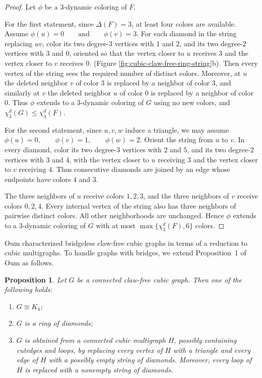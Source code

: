 \documentclass[a4paper,11pt]{article}
\newtheorem{proposition}[theorem] {Proposition}
\theoremstyle{case}
\numberwithin{subcase}{case}
\begin{document}
\begin{proof}
Let $\phi$ be a $3$-dynamic coloring of $F$.

For the first statement, since $\Delta(F)=3$, at least four colors are
available. Assume
$
\phi(u)=0
\qquad\text{and}\qquad
\phi(v)=3.
$
For each diamond in the string replacing $uv$, color its two degree-$3$
vertices with $1$ and $2$, and its two degree-$2$ vertices with $3$ and
$0$, oriented so that the vertex closer to $u$ receives $3$ and the
vertex closer to $v$ receives $0$.
(Figure \ref{fig:cubic-claw-free-ring-string}b).
Then every vertex of the string sees the required number of distinct
colors. Moreover, at $u$ the deleted neighbor $v$ of color $3$ is
replaced by a neighbor of color $3$, and similarly at $v$ the deleted
neighbor $u$ of color $0$ is replaced by a neighbor of color $0$.
Thus $\phi$ extends to a $3$-dynamic coloring of $G$ using no new
colors, and
$
\chi_3^d(G)\leq\chi_3^d(F).
$

For the second statement, 
since $u,v,w$ induce a triangle,
we may assume
$
\phi(u)=0,\qquad
\phi(v)=1,\qquad
\phi(w)=2.
$
Orient the string from $u$ to $v$. In every diamond, color its two
degree-$3$ vertices with $2$ and $5$, and its two degree-$2$ vertices
with $3$ and $4$, with the vertex closer to $u$ receiving $3$ and the
vertex closer to $v$ receiving $4$. Thus consecutive diamonds are
joined by an edge whose endpoints have colors $4$ and $3$.

The three neighbors of $u$ receive colors $1,2,3$, and the three
neighbors of $v$ receive colors $0,2,4$. Every internal vertex of the
string also has three neighbors of pairwise distinct colors. All other neighborhoods are unchanged.
Hence $\phi$ extends to a $3$-dynamic coloring of $G$ with at most
$\max\{\chi_3^d(F),6\}$ colors.
\end{proof}


Oum characterized bridgeless claw-free cubic graphs in terms of a reduction to cubic multigraphs. To handle graphs with bridges, we extend Proposition~1 of Oum \cite{Oum2011} as follows.

\begin{proposition} \label{prop:oum-extended}
Let $G$ be a connected claw-free cubic graph. Then one of the
following holds:
\begin{enumerate}
    \item $G\cong K_4$;
    \item $G$ is a ring of diamonds;
    \item $G$ is obtained from a connected cubic multigraph $H$,
    possibly containing cutedges and loops, by replacing every
    vertex of $H$ with a triangle and every edge of $H$ with a
    possibly empty string of diamonds. Moreover, every loop of $H$
    is replaced with a nonempty string of diamonds.
\end{enumerate}
\end{proposition}
\end{document}
